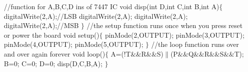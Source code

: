 \documentclass{article}
\begin{document}
\begin{enumerate}
\begin{enumerate}
{{		//function for A,B,C,D ins of 7447 IC
		\newline\newline
		void disp(int D,int C,int B,int A)$\{$ 
		\newline
		digitalWrite(2,A);//LSB
		\newline
		digitalWrite(2,A);
		\newline
		digitalWrite(2,A);
		\newline
		digitalWrite(2,A);//MSB $\}$
		\newline\newline
		//the setup function runs once when you press reset or power the board
		\newline\newline
		void setup()$\{$
		\newline
		pinMode(2,OUTPUT);
		\newline
		pinMode(3,OUTPUT);
		\newline
		pinMode(4,OUTPUT);
		\newline
		pinMode(5,OUTPUT);
		\newline$\}$
		\newline\newline
		//the loop function runs over and over again forever
		\newline\newline
		void loop()$\{$
		\newline
				A=(!T$\&\&$R$\&\&$S)$\|$(P$\&\&$Q$\&\&$R$\&\&$S$\&\&$T);
		\newline
		B=0;
		\newline
		C=0;
		\newline D=0;
		\newline
		disp(D,C,B,A);
		\newline$\}$}}
	\end{enumerate}
\end{enumerate}
\end{document}
